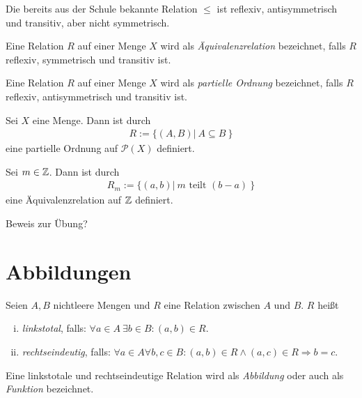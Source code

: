 \begin{example}
Die bereits aus der Schule bekannte Relation $\leq$ ist reflexiv,
antisymmetrisch und transitiv, aber nicht symmetrisch.
\end{example}

\begin{mydef}
Eine Relation $R$ auf einer Menge $X$ wird als \textit{Äquivalenzrelation}
bezeichnet, falls $R$ reflexiv, symmetrisch und transitiv ist.
\end{mydef}

\begin{mydef}
Eine Relation $R$ auf einer Menge $X$ wird als \textit{partielle Ordnung}
bezeichnet, falls $R$ reflexiv, antisymmetrisch und transitiv ist.
\end{mydef}

\begin{proposition}
Sei $X$ eine Menge.
Dann ist durch
\begin{align*}
    R := \{ (A,B) | \  A \subseteq B \ \}
\end{align*}
eine partielle Ordnung auf $\mathcal{P}(X)$ definiert.
\end{proposition}

\begin{proposition}
Sei $m \in \mathbb{Z}$.
Dann ist durch
\begin{align*}
    R_m := \{(a,b) | \ m \text{ teilt } (b-a) \ \}
\end{align*}
eine Äquivalenzrelation auf $\mathbb{Z}$ definiert.
\end{proposition}

Beweis zur Übung?

\section{Abbildungen}

\begin{mydef}
Seien $A,B$ nichtleere Mengen und $R$ eine Relation zwischen $A$ und $B$.
$R$ heißt
    \begin{enumerate}[(i)]
        \item
        \textit{linkstotal}, falls: $\forall a \in A \ \exists b \in B : (a,b) \in R$.
        \item
        \textit{rechtseindeutig}, falls: $\forall a \in A \forall b,c \in B: (a,b) \in R \wedge (a,c) \in R \Rightarrow b = c $.
\end{enumerate}
Eine linkstotale und rechtseindeutige Relation wird als \textit{Abbildung} oder
auch als \textit{Funktion} bezeichnet.
\end{mydef}

